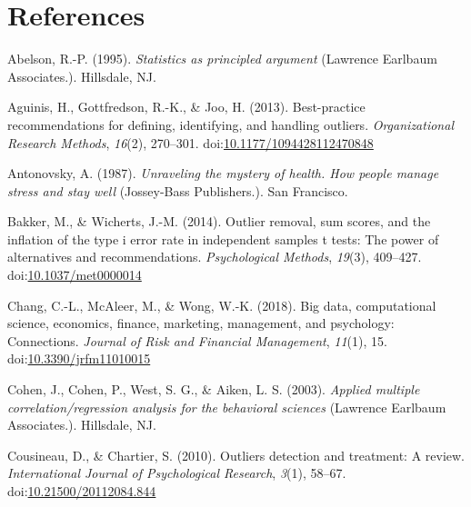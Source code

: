\documentclass[man,floatsintext]{apa6}
\begin{document}
\newpage

\hypertarget{references}{%
\section{References}\label{references}}

\setlength{\parindent}{-0.5in}
\setlength{\leftskip}{0.5in}

\hypertarget{refs}{}
\leavevmode\hypertarget{ref-Abelson_1995}{}%
Abelson, R.-P. (1995). \emph{Statistics as principled argument} (Lawrence Earlbaum Associates.). Hillsdale, NJ.

\leavevmode\hypertarget{ref-Aguinis_et_al_2013}{}%
Aguinis, H., Gottfredson, R.-K., \& Joo, H. (2013). Best-practice recommendations for defining, identifying, and handling outliers. \emph{Organizational Research Methods}, \emph{16}(2), 270--301. doi:\href{https://doi.org/10.1177/1094428112470848}{10.1177/1094428112470848}

\leavevmode\hypertarget{ref-Antonovsky_1987}{}%
Antonovsky, A. (1987). \emph{Unraveling the mystery of health. How people manage stress and stay well} (Jossey-Bass Publishers.). San Francisco.

\leavevmode\hypertarget{ref-Bakker_and_Wicherts_2014}{}%
Bakker, M., \& Wicherts, J.-M. (2014). Outlier removal, sum scores, and the inflation of the type i error rate in independent samples t tests: The power of alternatives and recommendations. \emph{Psychological Methods}, \emph{19}(3), 409--427. doi:\href{https://doi.org/10.1037/met0000014}{10.1037/met0000014}

\leavevmode\hypertarget{ref-Chang_et_al_2018}{}%
Chang, C.-L., McAleer, M., \& Wong, W.-K. (2018). Big data, computational science, economics, finance, marketing, management, and psychology: Connections. \emph{Journal of Risk and Financial Management}, \emph{11}(1), 15. doi:\href{https://doi.org/10.3390/jrfm11010015}{10.3390/jrfm11010015}

\leavevmode\hypertarget{ref-Cohen_et_al_2003}{}%
Cohen, J., Cohen, P., West, S. G., \& Aiken, L. S. (2003). \emph{Applied multiple correlation/regression analysis for the behavioral sciences} (Lawrence Earlbaum Associates.). Hillsdale, NJ.

\leavevmode\hypertarget{ref-Cousineau_Chartier_2010}{}%
Cousineau, D., \& Chartier, S. (2010). Outliers detection and treatment: A review. \emph{International Journal of Psychological Research}, \emph{3}(1), 58--67. doi:\href{https://doi.org/10.21500/20112084.844}{10.21500/20112084.844}
\end{document}
